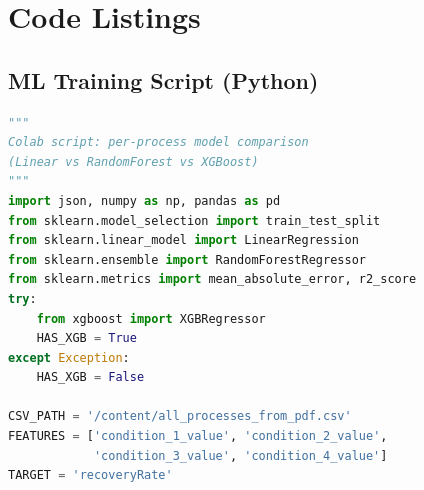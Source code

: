 \documentclass[12pt,a4paper]{report}
\newcommand{\code}[1]{\texttt{#1}}
\begin{document}
\appendix

\chapter{Code Listings}
\label{app:code}

\section{ML Training Script (Python)}

\begin{lstlisting}[language=Python, caption={Per-process model comparison script (\code{colab\_per\_process\_compare.py}).}, label={lst:mlscript}]
"""
Colab script: per-process model comparison
(Linear vs RandomForest vs XGBoost)
"""
import json, numpy as np, pandas as pd
from sklearn.model_selection import train_test_split
from sklearn.linear_model import LinearRegression
from sklearn.ensemble import RandomForestRegressor
from sklearn.metrics import mean_absolute_error, r2_score
try:
    from xgboost import XGBRegressor
    HAS_XGB = True
except Exception:
    HAS_XGB = False

CSV_PATH = '/content/all_processes_from_pdf.csv'
FEATURES = ['condition_1_value', 'condition_2_value',
            'condition_3_value', 'condition_4_value']
TARGET = 'recoveryRate'


\end{lstlisting}
\end{document}
